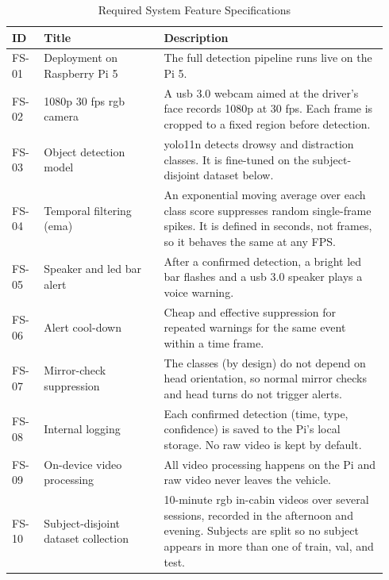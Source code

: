 \begin{table}[htbp]
\centering
\caption{Required System Feature Specifications}
\label{tab:req-features}
\footnotesize
\setlength{\tabcolsep}{4pt}
\renewcommand{\arraystretch}{1.15}
\begin{tabular}{|p{0.08\linewidth}|p{0.30\linewidth}|p{0.56\linewidth}|}
\hline
\textbf{ID} & \textbf{Title} & \textbf{Description} \\
\hline
FS-01 & Deployment on Raspberry Pi 5 & The full detection pipeline runs live on the Pi 5. \\
\hline
FS-02 & 1080p 30 \gls{fps} \gls{rgb} camera & A \gls{usb} 3.0 webcam aimed at the driver's face records 1080p at 30 \gls{fps}. Each frame is cropped to a fixed region before detection. \\
\hline
FS-03 & Object detection model & \gls{yolo}11n detects drowsy and distraction classes. It is fine-tuned on the subject-disjoint dataset below. \\
\hline
FS-04 & Temporal filtering (\gls{ema}) & An exponential moving average over each class score suppresses random single-frame spikes. It is defined in seconds, not frames, so it behaves the same at any FPS. \\
\hline
FS-05 & Speaker and \gls{led} bar alert & After a confirmed detection, a bright \gls{led} bar flashes and a \gls{usb} 3.0 speaker plays a voice warning. \\
\hline
FS-06 & Alert cool-down & Cheap and effective suppression for repeated warnings for the same event within a time frame.\\
\hline
FS-07 & Mirror-check suppression & The classes (by design) do not depend on head orientation, so normal mirror checks and head turns do not trigger alerts. \\
\hline
FS-08 & Internal logging & Each confirmed detection (time, type, confidence) is saved to the Pi's local storage. No raw video is kept by default. \\
\hline
FS-09 & On-device video processing & All video processing happens on the Pi and raw video never leaves the vehicle. \\
\hline
FS-10 & Subject-disjoint dataset collection & 10-minute \gls{rgb} in-cabin videos over several sessions, recorded in the afternoon and evening. Subjects are split so no subject appears in more than one of train, val, and test.\\
\hline
\end{tabular}
\end{table}

